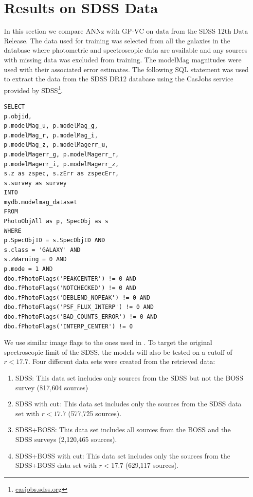 \documentclass[useAMS,usenatbib,fleqn]{mn2e}
\begin{document}
\section{Results on SDSS Data}
\label{sec-experiments-sdss}

In this section we compare {\sc ANNz} with GP-VC on data from the SDSS 12th Data Release. The data used for training was selected from all the galaxies in the database where photometric and spectroscopic data are available and any sources with missing data was excluded from training. The {\selectfont modelMag} magnitudes were used with their associated error estimates. The following SQL statement was used to extract the data from the SDSS DR12 database using the CasJobs service provided by SDSS\footnote{\url{casjobs.sdss.org}}.

\begin{verbatim}
SELECT
p.objid,
p.modelMag_u, p.modelMag_g,
p.modelMag_r, p.modelMag_i,
p.modelMag_z, p.modelMagerr_u,
p.modelMagerr_g, p.modelMagerr_r,
p.modelMagerr_i, p.modelMagerr_z,
s.z as zspec, s.zErr as zspecErr,
s.survey as survey
INTO
mydb.modelmag_dataset
FROM
PhotoObjAll as p, SpecObj as s
WHERE
p.SpecObjID = s.SpecObjID AND
s.class = 'GALAXY' AND 
s.zWarning = 0 AND
p.mode = 1 AND
dbo.fPhotoFlags('PEAKCENTER') != 0 AND
dbo.fPhotoFlags('NOTCHECKED') != 0 AND
dbo.fPhotoFlags('DEBLEND_NOPEAK') != 0 AND
dbo.fPhotoFlags('PSF_FLUX_INTERP') != 0 AND
dbo.fPhotoFlags('BAD_COUNTS_ERROR') != 0 AND
dbo.fPhotoFlags('INTERP_CENTER') != 0
\end{verbatim}

We use similar image flags to the ones used in \citet{brescia2014catalogue}. To target the original spectroscopic limit of the SDSS, the models will also be tested on a cutoff of $r<17.7$. Four different data sets were created from the retrieved data:
\begin{enumerate}
  \item SDSS: This data set includes only sources from the SDSS but not the BOSS survey (817,604 sources) 
  \item SDSS with cut: This data set includes only the sources from the SDSS data set with $r<17.7$ (577,725 sources).
  \item SDSS+BOSS: This data set includes all sources from the BOSS and the SDSS surveys (2,120,465 sources). 
  \item SDSS+BOSS with cut: This data set includes only the sources from the SDSS+BOSS data set with $r<17.7$ (629,117 sources). 
\end{enumerate}
\end{document}
